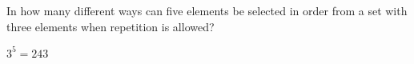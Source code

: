 \documentclass[../main.tex]{subfiles}
\begin{document}
In how many different ways can five elements be selected in order from a set with three elements when repetition is allowed?

\solution
$3^5 = 243$
\end{document}
